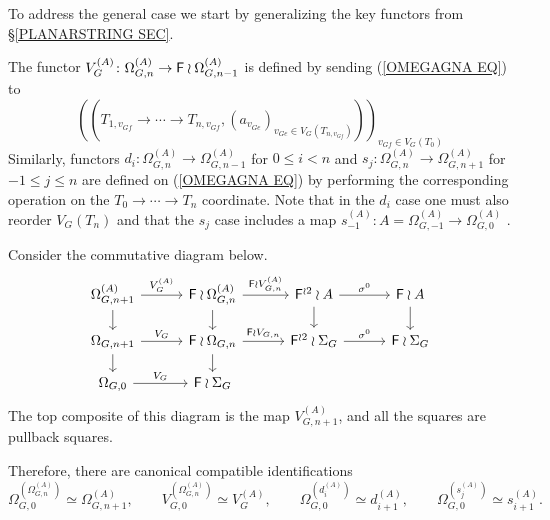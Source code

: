\documentclass[a4paper,10pt]{article}%
\begin{document}
To address the general case we start by generalizing the key functors from \S \ref{PLANARSTRING SEC}.

\begin{notation}
	The functor $V_G^{(A)} \colon \Omega_{G,n}^{(A)}
	\to \mathsf{F} \wr \Omega_{G,n-1}^{(A)}$ is defined by sending (\ref{OMEGAGNA EQ}) to
	\begin{equation}\label{VGDEFA EQ}
	\left(
		\left(
		T_{1,v_{G f}} \to \cdots \to T_{n,v_{G f}},
		\left(
		a_{v_{G e}}
		\right)_{v_{G e} \in V_G\left(T_{n,v_{G f}}\right)}
		\right)
	\right)_{v_{G f} \in V_G(T_0)}
\end{equation}
Similarly, functors 
$d_i \colon \Omega_{G,n}^{(A)} \to \Omega_{G,n-1}^{(A)}$
for $0 \leq i < n$
and 
$s_j \colon \Omega_{G,n}^{(A)} \to \Omega_{G,n+1}^{(A)}$
for $-1 \leq j \leq n$
are defined on (\ref{OMEGAGNA EQ})
by performing the corresponding operation on the $T_0 \to \cdots \to T_n$ coordinate.
Note that in the $d_i$ case one must also reorder $V_G(T_n)$
and that the $s_j$ case includes a map  
$s_{-1}^{(A)} \colon A = \Omega_{G,-1}^{(A)} \to \Omega_{G,0}^{(A)}$ .
\end{notation}


\begin{proposition}
Consider the commutative diagram below.
\begin{equation}\label{ALLSQUARES EQ}
\begin{tikzcd}[row sep = 1.3em,column sep = 3em]
	\Omega^{(A)}_{G,n+1} \ar{r}{V_G^{(A)}} \ar{d}& 
	\Fin \wr \Omega^{(A)}_{G,n} \ar{r}{\Fin \wr V_{G,n}^{(A)}} \ar{d}&
	\Fin^{\wr 2} \wr A  \ar{d} \ar{r}{\sigma^0} &
	\Fin \wr A \ar{d}
\\
	\Omega_{G,n+1} \ar{r}{V_G} \ar{d} &
	\Fin \wr \Omega_{G,n} \ar{r}{\Fin \wr V_{G,n}} \ar{d} &
	\Fin^{\wr 2} \wr \Sigma_G \ar{r}{\sigma^0} &
	\Fin \wr \Sigma_G
\\
	\Omega_{G,0} \ar{r}{V_G} &
	\Fin \wr \Sigma_G
\end{tikzcd}
\end{equation}
The top composite of this diagram is the map
$V_{G,n+1}^{(A)}$, and all the squares are pullback squares.

Therefore, there are canonical compatible identifications
\begin{equation}\label{FOURIDE EQ}
\Omega_{G,0}^{\left(\Omega_{G,n}^{(A)}\right)} \simeq \Omega_{G,n+1}^{(A)}, \qquad 
V_{G,0}^{\left(\Omega_{G,n}^{(A)}\right)} \simeq V_G^{(A)},\qquad
\Omega_{G,0}^{\left(d_i^{(A)}\right)}\simeq d^{(A)}_{i+1},\qquad
\Omega_{G,0}^{\left(s_j^{(A)}\right)}\simeq s^{(A)}_{i+1}.
\end{equation}
\end{proposition}
\end{document}
